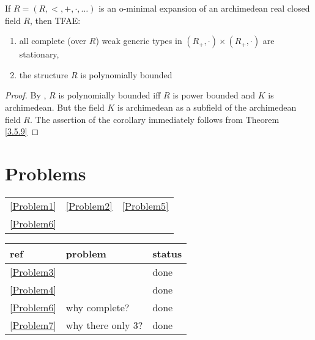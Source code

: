 \documentclass[11pt]{article}
\begin{document}
\begin{corollary}[]
If \(R=(R,<,+,\cdot,\dots)\) is an o-minimal expansion of an archimedean real closed field \(R\), then
TFAE:
\begin{enumerate}
\item all complete (over \(R\)) weak generic types in \((R_+,\cdot)\times(R_+,\cdot)\) are stationary,
\item the structure \(R\) is polynomially bounded
\end{enumerate}
\end{corollary}

\begin{proof}
By \cite{miller1996growth}, \(R\) is polynomially bounded iff \(R\) is power bounded and \(K\) is
archimedean. But the field \(K\) is archimedean as a subfield of the archimedean field \(R\).
The assertion of the corollary immediately follows from Theorem \ref{3.5.9}
\end{proof}


\section{Problems}
\label{sec:org660ebef}
\begin{center}
\begin{tabular}{lll}
\ref{Problem1} & \ref{Problem2} & \ref{Problem5}\\
\ref{Problem6} &  & \\
\end{tabular}
\end{center}

\begin{center}
\begin{tabular}{lll}
ref & problem & status\\
\hline
\ref{Problem3} &  & done\\
\ref{Problem4} &  & done\\
\ref{Problem6} & why complete? & done\\
\ref{Problem7} & why there only 3? & done\\
\end{tabular}
\end{center}

\label{bibliographystyle link}


\label{bibliography link}

\end{document}
